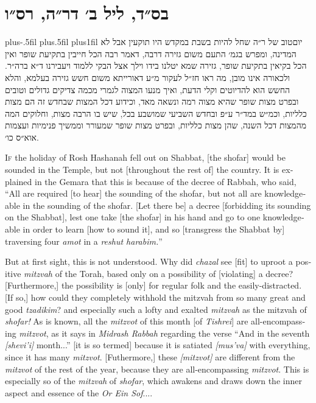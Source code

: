 \documentclass[12pt]{book}
\title{
    יום טוב של ראש השנה
    \vskip0.1em
    {\fontsize{50}{60}\selectfont
    תרס״ו
    }
}
\author{}
\date{}
\begin{document}
\maketitle

\section*{בס״ד, ליל ב׳ דר״ה, רס״ו}
\leftskip=0pt plus-.5fil
\rightskip=0pt plus.5fil
\parfillskip=0pt plus1fil
\lettrine[findent=0.75em, nindent=0em, loversize=-.4, lraise=.6]{יום}
 טוב של ר״ה שחל להיות בשבת במקדש היו תוקעין אבל לא המדינה, ומפרש בגמ׳ התעם משום גזירה דרבה, דאמר רבה הכל חייבין בתקיעת שופר ואין הכל בקיאין בתקיעת שופר, גזירה שמא יטלנו בידו וילך אצל הבקי ללמוד ויעבירנו ד״א ברה״ר. ולכאורה אינו מובן, מה ראו חז״ל לעקור מ״ע דאורייתא משום חשש גזירה בעלמא, והלא החשש הוא להדיוטים וקלי הדעת, ואיך מנעו המצוה לגמרי מכמה צדיקים גדולים וטובים ובפרט מצות שופר שהיא מצוה רמה ונשאה מאד, וכידוע דכל המצות שבחדש זה הם מצות כלליות, וכמ״ש במד״ר ע״פ ובחדש השביעי שמושבע בכל, שיש בו הרבה מצות, וחלוקים המה מהמצות דכל השנה, שהן מצות כלליות, ובפרט מצות שופר שמעורר וממשיך פנימיות ועצמות אוא״ס כו׳.

\begin{english}
    \leftskip=0pt \rightskip=0pt
\noindent \lettrine{I}{f} the holiday of Rosh Hashanah fell out on Shabbat, [the shofar] would be sounded in the Temple, but not [throughout the rest of] the country. It is explained in the Gemara that this is because of the decree of Rabbah, who said, ``All are required [to hear] the sounding of the shofar, but not all are knowledgeable in the sounding of the shofar. [Let there be] a decree [forbidding its sounding on the Shabbat], lest one take [the shofar] in his hand and go to one knowledgeable in order to learn [how to sound it], and so [transgress the Shabbat by] traversing four \emph{amot} in a \emph{reshut harabim.}''

    But at first sight, this is not understood. Why did \emph{chazal} see [fit] to uproot a positive \emph{mitzvah} of the Torah, based only on a possibility of [violating] a decree? [Furthermore,] the possibility is [only] for regular folk and the easily-distracted. [If so,] how could they completely withhold the mitzvah from so many great and good \emph{tzadikim}? and especially such a lofty and exalted \emph{mitzvah} as the mitzvah of \emph{shofar!} As is known, all the \emph{mitzvot} of this month [of \emph{Tishrei}] are all-encompassing \emph{mitzvot}, as it says in \emph{Midrash Rabbah} regarding the verse ``And in the seventh \emph{[shevi'i]} month...'' [it is so termed] because it is satiated \emph{[mus'va]} with everything, since it has many \emph{mitzvot}. [Futhermore,] these \emph{[mitzvot]} are different from the \emph{mitzvot} of the rest of the year, because they are all-encompassing \emph{mitzvot}. This is especially so of the \emph{mitzvah} of \emph{shofar}, which awakens and draws down the inner aspect and essence of the \emph{Or Ein Sof}....

\end{english}
\end{document}
